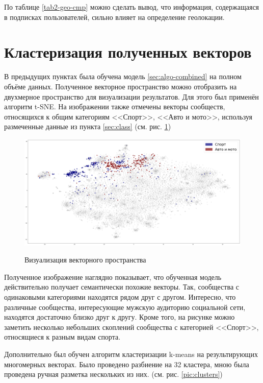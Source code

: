 \documentclass[times,specification,annotation]{itmo-student-thesis}
\begin{document}
По таблице \ref {tab2-geo-cmp} можно сделать вывод, что информация, содержащаяся в подписках пользователей, сильно влияет на определение геолокации. 

\section{Кластеризация полученных векторов}\label{sec:visual}

В предыдущих пунктах была обучена модель \ref{sec:algo-combined} на полном объёме данных. Полученное векторное пространство можно отобразить на двухмерное пространство для визуализации результатов. Для этого был применён алгоритм t-SNE. На изображении также отмечены векторы сообществ, относящихся к общим категориям <<Спорт>>, <<Авто и мото>>, используя размеченные данные из пункта \ref{sec:class} (см. рис. \ref{pic:categories})

\begin{figure}[h]
\caption{Визуализация векторного пространства}
\centering
\includegraphics[width=1\textwidth]{index0}
\label{pic:categories}
\end{figure}

Полученное изображение наглядно показывает, что обученная модель действительно получает семантически похожие векторы. Так, сообщества с одинаковыми категориями находятся рядом друг с другом. Интересно, что различные сообщества, интересующие мужскую аудиторию социальной сети, находятся достаточно близко друг к другу. Кроме того, на рисунке можно заметить несколько небольших скоплений сообщества с категорией <<Спорт>>, относящиеся к разным видам спорта.  

Дополнительно был обучен алгоритм кластеризации k-means на результирующих многомерных векторах. Было проведено разбиение на 32 кластера, мною была проведена ручная разметка нескольких из них. (см. рис. \ref{pic:clusters})
\end{document}
